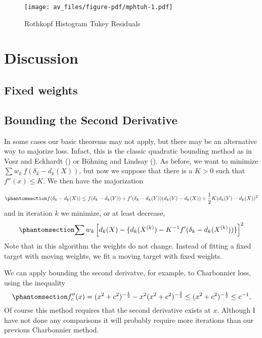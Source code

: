 \documentclass[
  12pt,
  letterpaper,
  DIV=11,
  numbers=noendperiod]{scrartcl}
\newcommand{\sectionbreak}{\pagebreak}
\theoremstyle{plain}
\theoremstyle{plain}
\theoremstyle{plain}
\theoremstyle{definition}
\theoremstyle{remark}
\begin{document}
\begin{figure}[H]

{\centering \texttt{[image: av\_files/figure-pdf/mphtuh-1.pdf]}

}

\caption{Rothkopf Histogram Tukey Residuals}

\end{figure}%

\sectionbreak

\section{Discussion}\label{discussion}

\subsection{Fixed weights}\label{fixed-weights}

\subsection{Bounding the Second
Derivative}\label{bounding-the-second-derivative}

In some cases our basic theorems may not apply, but there may be an
alternative way to majorize loss. Infact, this is the classic quadratic
bounding method as in Vosz and Eckhardt
() or Böhning and Lindsay
(). As before, we want to
minimize \(\sum w_k\ f(\delta_k-d_k(X))\), but now we suppose that there
is a \(K>0\) such that \(f''(x)\leq K\). We then have the majorization

\begin{equation}\phantomsection\label{eq-qbound}{
f(\delta_k-d_k(X))\leq f(\delta_k-d_k(Y))+f'(\delta_k-d_k(Y))(d_k(Y)-d_k(X))+\frac12K(d_k(Y)-d_k(X))^2
}\end{equation} and in iteration \(k\) we minimize, or at least
decrease, \begin{equation}\phantomsection\label{eq-qiter}{
\sum w_k\left[d_k(X)-\{d_k(X^{(k)})-K^{-1}f'(\delta_k-d_k(X^{(k)}))\}\right]^2
}\end{equation} Note that in this algorithm the weights do not change.
Instead of fitting a fixed target with moving weights, we fit a moving
target with fixed weights.

We can apply bounding the second derivatve, for example, to Charbonnier
loss, using the inequality
\begin{equation}\phantomsection\label{eq-chark}{
f_c''(x)=(x^2 + c^2)^{-\frac12}-x^2(x^2 + c^2)^{-\frac32}\leq(x^2 + c^2)^{-\frac12}\leq c^{-1},
}\end{equation} Of course this method requires that the second
derivative exists at \(x\). Although I have not done any comparisons it
will probably require more iterations than our previous Charbonnier
method.
\end{document}
